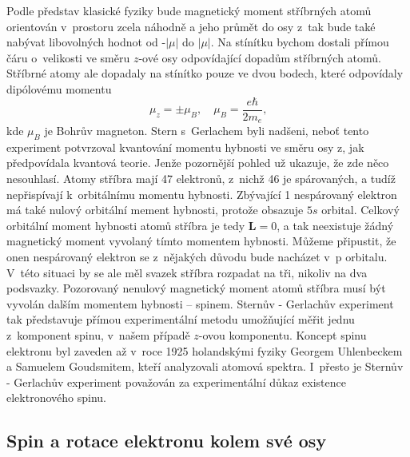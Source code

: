 Podle představ klasické fyziky bude magnetický moment stříbrných atomů orientován v~prostoru zcela náhodně a jeho průmět do osy z~tak bude také nabývat libovolných hodnot od -$|\mu|$ do $|\mu|$. Na stínítku bychom dostali přímou čáru o~velikosti ve směru $z$-ové osy odpovídající dopadům stříbrných atomů. Stříbrné atomy ale dopadaly na stínítko pouze ve dvou bodech, které odpovídaly dipólovému momentu
\begin{equation}
\mu_z = \pm \mu_B, \quad \mu_B = \frac{e\hbar}{2m_e}\mbox{,}
\label{rov:Spin7}
\end{equation}
kde $\mu_B$ je Bohrův magneton. Stern s~Gerlachem byli nadšeni, neboť tento experiment potvrzoval kvantování momentu hybnosti ve směru osy z, jak předpovídala kvantová teorie. Jenže pozornější pohled už ukazuje, že zde něco nesouhlasí.  Atomy stříbra mají 47 elektronů, z~nichž 46 je spárovaných, a tudíž nepřispívají k~orbitálnímu momentu hybnosti. Zbývající 1 nespárovaný elektron má také nulový orbitální mement hybnosti, protože obsazuje $5s$ orbital. Celkový orbitální moment hybnosti atomů stříbra je tedy $\mathbf{L}=0$, a tak neexistuje žádný magnetický moment vyvolaný tímto momentem hybnosti. Můžeme připustit, že onen nespárovaný elektron se z~nějakých důvodu bude nacházet v~p orbitalu. V~této situaci by se ale měl svazek stříbra rozpadat na tři, nikoliv na dva podsvazky. Pozorovaný nenulový magnetický moment atomů stříbra musí být vyvolán dalším momentem hybnosti -- spinem. Sternův - Gerlachův experiment tak představuje přímou experimentální metodu umožňující měřit jednu z~komponent spinu, v~našem případě $z$-ovou komponentu. Koncept spinu elektronu byl zaveden až v~roce 1925 holandskými fyziky Georgem Uhlenbeckem a Samuelem Goudsmitem, kteří analyzovali atomová spektra. I~přesto je Sternův - Gerlachův experiment považován za experimentální důkaz existence elektronového spinu.


\subsection{Spin a rotace elektronu kolem své osy}

